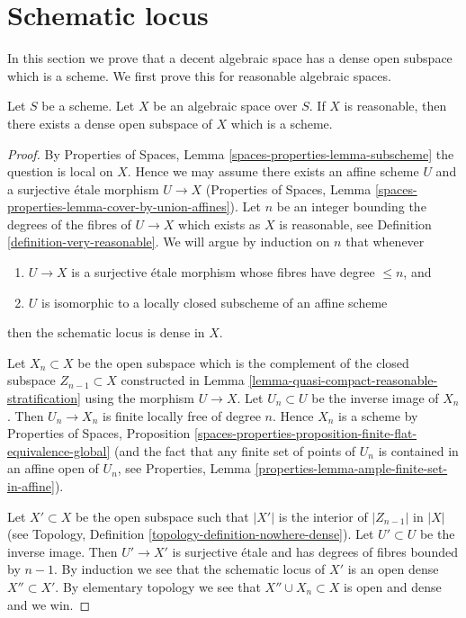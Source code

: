 





\section{Schematic locus}
\label{section-schematic}

\noindent
In this section we prove that a decent algebraic space has a dense open
subspace which is a scheme. We first prove this for reasonable algebraic
spaces.


\begin{proposition}
\label{proposition-reasonable-open-dense-scheme}
Let $S$ be a scheme. Let $X$ be an algebraic space over $S$.
If $X$ is reasonable, then there exists a dense open subspace
of $X$ which is a scheme.
\end{proposition}

\begin{proof}
By Properties of Spaces,
Lemma \ref{spaces-properties-lemma-subscheme}
the question is local on $X$. Hence we may assume there exists an affine
scheme $U$ and a surjective \'etale morphism $U \to X$
(Properties of Spaces, Lemma
\ref{spaces-properties-lemma-cover-by-union-affines}).
Let $n$ be an integer bounding the degrees of the fibres of $U \to X$
which exists as $X$ is reasonable, see
Definition \ref{definition-very-reasonable}.
We will argue by induction on $n$ that whenever
\begin{enumerate}
\item $U \to X$ is a surjective \'etale morphism whose fibres have
degree $\leq n$, and
\item $U$ is isomorphic to a locally closed subscheme of an affine scheme
\end{enumerate}
then the schematic locus is dense in $X$.

\medskip\noindent
Let $X_n \subset X$ be the open subspace which is the complement of the
closed subspace $Z_{n - 1} \subset X$ constructed in
Lemma \ref{lemma-quasi-compact-reasonable-stratification}
using the morphism $U \to X$.
Let $U_n \subset U$ be the inverse image of $X_n$. Then
$U_n \to X_n$ is finite locally free of degree $n$.
Hence $X_n$ is a scheme by
Properties of Spaces, Proposition
\ref{spaces-properties-proposition-finite-flat-equivalence-global}
(and the fact that any finite set of points of $U_n$ is contained in
an affine open of $U_n$, see
Properties, Lemma \ref{properties-lemma-ample-finite-set-in-affine}).

\medskip\noindent
Let $X' \subset X$ be the open subspace such that $|X'|$ is the
interior of $|Z_{n - 1}|$ in $|X|$ (see
Topology, Definition \ref{topology-definition-nowhere-dense}).
Let $U' \subset U$ be the inverse image. Then $U' \to X'$ is surjective
\'etale and has degrees of fibres bounded by $n - 1$. By induction
we see that the schematic locus of $X'$ is an open dense $X'' \subset X'$.
By elementary topology we see that $X'' \cup X_n \subset X$ is
open and dense and we win.
\end{proof}

